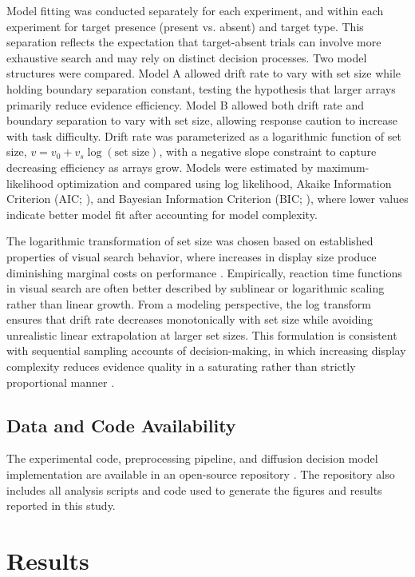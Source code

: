 \documentclass[stu,12pt,floatsintext]{apa7}
\begin{document}
Model fitting was conducted separately for each experiment, and within each experiment for target presence (present vs. absent) and target type. This separation reflects the expectation that target-absent trials can involve more exhaustive search and may rely on distinct decision processes. Two model structures were compared. Model A allowed drift rate to vary with set size while holding boundary separation constant, testing the hypothesis that larger arrays primarily reduce evidence efficiency. Model B allowed both drift rate and boundary separation to vary with set size, allowing response caution to increase with task difficulty. Drift rate was parameterized as a logarithmic function of set size, $v = v_0 + v_s \log(\text{set size})$, with a negative slope constraint to capture decreasing efficiency as arrays grow. Models were estimated by maximum-likelihood optimization and compared using log likelihood, Akaike Information Criterion (AIC; \parencite{Akaike1974}), and Bayesian Information Criterion (BIC; \parencite{Schwarz1978}), where lower values indicate better model fit after accounting for model complexity.

The logarithmic transformation of set size was chosen based on established properties of visual search behavior, where increases in display size produce diminishing marginal costs on performance \parencite{Wolfe1998}. Empirically, reaction time functions in visual search are often better described by sublinear or logarithmic scaling rather than linear growth. From a modeling perspective, the log transform ensures that drift rate decreases monotonically with set size while avoiding unrealistic linear extrapolation at larger set sizes. This formulation is consistent with sequential sampling accounts of decision-making, in which increasing display complexity reduces evidence quality in a saturating rather than strictly proportional manner \parencite{Ratcliff2008}.

\subsection{Data and Code Availability}

The experimental code, preprocessing pipeline, and diffusion decision model implementation are available in an open-source repository \parencite{FaceSearchRepo}. The repository also includes all analysis scripts and code used to generate the figures and results reported in this study.

\section{Results}
\end{document}
